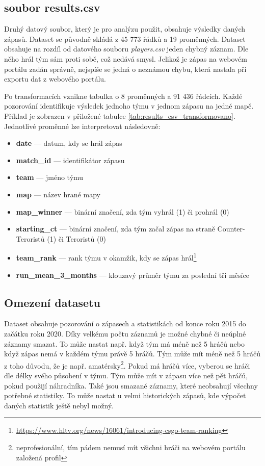 {\color{red}
\subsection{soubor results.csv}
Druhý datový soubor, který je pro analýzu použit, obsahuje výsledky daných zápasů. Dataset se původně skládá z 45 773 řádků a 19 proměnných. Dataset obsahuje na rozdíl
od datového souboru \textit{players.csv} jeden chybný záznam. Dle něho hrál tým sám proti sobě, což nedává smysl. Jelikož je zápas na webovém portálu zadán
správně, nejspíše se jedná o neznámou chybu, která nastala při exportu dat z webového portálu.
}
Po transformacích vznikne tabulka o 8 proměnných a 91 436 řádcích. Každé pozorování identifikuje výsledek jednoho týmu v jednom zápasu
na jedné mapě. Příklad je zobrazen v přiložené tabulce \ref{tab:results_csv_transformovano}. Jednotlivé proměnné lze interpretovat následovně:
\begin{itemize}
    \item \textbf{date} --- datum, kdy se hrál zápas
    \item \textbf{match\_id} --- identifikátor zápasu
    \item \textbf{team} --- jméno týmu
    \item \textbf{map} --- název hrané mapy
    \item \textbf{map\_winner} --- binární značení, zda tým vyhrál (1) či prohrál (0)
    \item \textbf{starting\_ct} --- binární značení, zda tým začal zápas na straně Counter-Teroristů (1) či Teroristů (0)
    \item \textbf{team\_rank} --- rank týmu v okamžik, kdy se zápas hrál\footnote{\url{https://www.hltv.org/news/16061/introducing-csgo-team-ranking}}
    \item \textbf{run\_mean\_3\_months} --- klouzavý průměr týmu za poslední tři měsíce
\end{itemize}

{\color{red}
\subsection{Omezení datasetu}
Dataset obsahuje pozorování o zápasech a statistikách od konce roku 2015 do začátku roku 2020. Díky velkému počtu záznamů je možné chybné či neúplné záznamy
smazat. To může nastat např. když tým má méně než 5 hráčů nebo když zápas nemá v každém týmu právě 5 hráčů. Tým může mít méně než 5 hráčů z toho důvodu, že je např.
amatérsky\footnote{neprofesionální, tím pádem nemusí mít všichni hráči na webovém portálu založená profil}. Pokud má hráčů více, vyberou se hráči dle délky svého působení v týmu.
Tým může mít v zápasu více než pět hráčů, pokud použijí náhradníka. Také jsou smazané záznamy, které neobsahují všechny potřebné statistiky. To může nastat u velmi historických
zápasů, kde výpočet daných statistik ještě nebyl možný.
}

